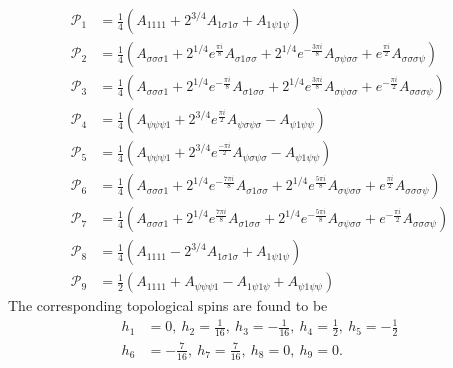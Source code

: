 \documentclass[12 pt]{article}
\begin{document}
\begin{align*}
    \mathcal{P}_1 & =\frac{1}{4}\left(A_{1111}+2^{3/4}A_{1\sigma 1\sigma}+A_{1\psi 1\psi}\right)                                                                                                                                  \\
    \mathcal{P}_2 & =\frac{1}{4}\left(A_{\sigma\sigma \sigma 1}+2^{1/4}e^{\frac{\pi i}{8}}A_{\sigma 1\sigma\sigma}+2^{1/4}e^{-\frac{3\pi i}{8}}A_{\sigma\psi\sigma\sigma}+e^{\frac{\pi i}{2}}A_{\sigma\sigma\sigma\psi} \right)   \\
    \mathcal{P}_3 & =\frac{1}{4}\left(A_{\sigma\sigma \sigma 1}+2^{1/4}e^{-\frac{\pi i}{8}}A_{\sigma 1\sigma\sigma}+2^{1/4}e^{\frac{3\pi i}{8}}A_{\sigma \psi\sigma\sigma}+e^{-\frac{\pi i}{2}}A_{\sigma\sigma\sigma\psi} \right) \\
    \mathcal{P}_4 & =\frac{1}{4}\left(A_{\psi\psi\psi1}+2^{3/4}e^{\frac{\pi i}{2}}A_{\psi\sigma\psi\sigma}-A_{\psi 1\psi\psi}\right)                                                                                              \\
    \mathcal{P}_5 & =\frac{1}{4}\left(A_{\psi\psi\psi1}+2^{3/4}e^{\frac{-\pi i}{2}}A_{\psi\sigma\psi\sigma}-A_{\psi 1\psi\psi}\right)                                                                                             \\
    \mathcal{P}_6 & =\frac{1}{4}\left(A_{\sigma\sigma\sigma 1}+2^{1/4}e^{-\frac{7 \pi i}{8}}A_{\sigma 1\sigma\sigma}+2^{1/4}e^{\frac{5 \pi i}{8}}A_{\sigma \psi\sigma\sigma}+e^{\frac{\pi i}{2}}A_{\sigma\sigma\sigma\psi}\right) \\
    \mathcal{P}_7 & =\frac{1}{4}\left(A_{\sigma\sigma\sigma1}+2^{1/4}e^{\frac{7 \pi i}{8}}A_{\sigma 1\sigma\sigma}+2^{1/4}e^{-\frac{5 \pi i}{8}}A_{\sigma\psi\sigma\sigma}+e^{-\frac{\pi i}{2}}A_{\sigma\sigma\sigma\psi}\right)  \\
    \mathcal{P}_8 & =\frac{1}{4}\left(A_{1111}-2^{3/4}A_{1\sigma 1\sigma}+A_{1\psi 1\psi}\right)                                                                                                                                  \\
    \mathcal{P}_9 & =\frac{1}{2}\left(A_{1111}+A_{\psi\psi\psi 1}-A_{1\psi 1\psi}+A_{\psi 1\psi\psi}\right)
\end{align*}
The corresponding topological spins are found to be
\begin{align*}
    h_1 & =0,\: h_2=\frac{1}{16},\: h_3=-\frac{1}{16},\: h_4=\frac{1}{2}, \: h_5=-\frac{1}{2} \\
    h_6 & =-\frac{7}{16},\: h_7=\frac{7}{16},\: h_8=0, \: h_9=0.
\end{align*}
\end{document}
